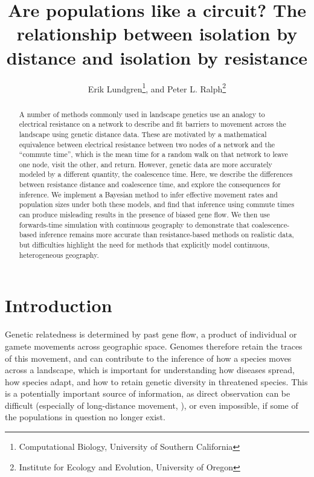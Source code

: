 \documentclass{article}
\begin{document}
\title{Are populations like a circuit? The relationship between isolation by distance and isolation by resistance}
\author{Erik Lundgren\footnote{Computational Biology, University of Southern California}, and
        Peter L. Ralph\footnote{Institute for Ecology and Evolution, University of Oregon}}
\maketitle

\linenumbers

\begin{abstract}
A number of methods commonly used in landscape genetics
use an analogy to electrical resistance on a network
to describe and fit barriers to movement across the landscape
using genetic distance data.
These are motivated by a mathematical equivalence between electrical resistance 
between two nodes of a network
and the ``commute time'',
which is the mean time for a random walk on that network to leave one node, visit the other, and return.
However, genetic data are more accurately modeled by a different quantity,
the coalescence time.
Here, we describe the differences between resistance distance and coalescence time,
and explore the consequences for inference.
We implement a Bayesian method to infer effective movement rates and population sizes 
under both these models,
and find that inference using commute times
can produce misleading results in the presence of biased gene flow.
We then use forwards-time simulation with continuous geography to demonstrate that
coalescence-based inference remains more accurate than resistance-based methods on realistic data,
but difficulties highlight the need for methods 
that explicitly model continuous, heterogeneous geography.
\end{abstract}


\section*{Introduction}

Genetic relatedness is determined by past gene flow,
a product of individual or gamete movements across geographic space.
Genomes therefore retain the traces of this movement,
and can contribute to the inference of how a species moves across a landscape,
which is important for understanding how diseases spread, how species adapt,
and how to retain genetic diversity in threatened species.
This is a potentially important source of information,
as direct observation can be difficult 
(especially of long-distance movement, \citep{cayuelademographic,levin_et_al_seed_dispersal}),
or even impossible, if some of the populations in question no longer exist. 
\end{document}
